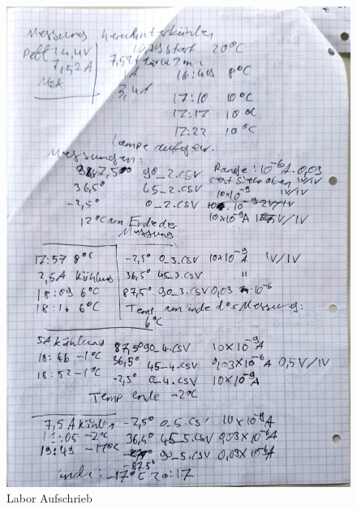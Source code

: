 \begin{figure}
	\includegraphics[scale=0.35]{Bild/Lab2}
	\centering
	\caption{Labor Aufschrieb}
\end{figure}

